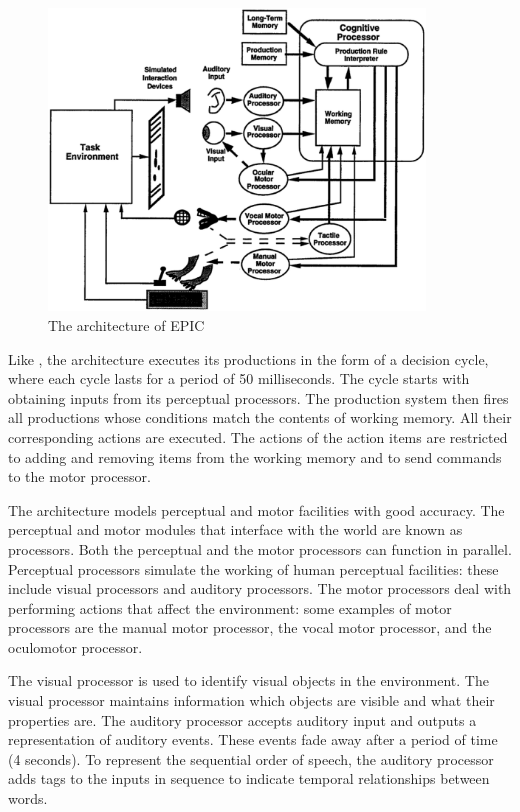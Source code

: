 \begin{figure}[htp]
  \centering
  \includegraphics[width=100mm]{EPIC}
  \caption{The architecture of EPIC\cite{citeulike:3439185}}
  \label{EPIC_ARCH}
\end{figure}
Like \soar, the \epic architecture executes its productions in the
form of a decision cycle, where each cycle lasts for a period of
50 milliseconds. The cycle starts with obtaining inputs from its perceptual
processors. The production system then fires all productions whose
conditions match the contents of working memory.  All their
corresponding actions are executed. The actions of the action items
are restricted to adding and removing items from the working memory
and to send commands to the motor processor.

The \epic architecture models perceptual and motor facilities with
good accuracy. The perceptual and motor modules that interface with
the world are known as processors. Both the perceptual and the motor
processors can function in parallel. Perceptual processors simulate
the working of human perceptual facilities: these include visual
processors and auditory processors. The motor processors deal with
performing actions that affect the environment: some examples of motor
processors are the manual motor processor, the vocal motor processor,
and the oculomotor processor.

The visual processor is used to identify visual objects in the
environment. The visual processor maintains information which objects
are visible and what their properties are. The auditory processor
accepts auditory input and outputs a representation of auditory
events. These events fade away after a period of time (4 seconds). To
represent the sequential order of speech, the auditory processor adds
tags to the inputs in sequence to indicate temporal relationships
between words.

